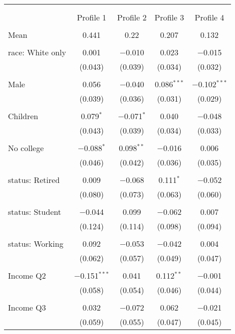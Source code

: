 
\begin{tabular}{@{\extracolsep{5pt}}lcccc} 
\\[-1.8ex]\hline 
\hline \\[-1.8ex] 
\\[-1.8ex] & Profile 1 & Profile 2 & Profile 3 & Profile 4 \\ 
\hline \\[-1.8ex] 
 Mean & 0.441 & 0.22 & 0.207 & 0.132  \\ \hline \\[-1.8ex] race: White only & 0.001 & $-$0.010 & 0.023 & $-$0.015 \\ 
  & (0.043) & (0.039) & (0.034) & (0.032) \\ 
  & & & & \\ 
 Male & 0.056 & $-$0.040 & 0.086$^{***}$ & $-$0.102$^{***}$ \\ 
  & (0.039) & (0.036) & (0.031) & (0.029) \\ 
  & & & & \\ 
 Children & 0.079$^{*}$ & $-$0.071$^{*}$ & 0.040 & $-$0.048 \\ 
  & (0.043) & (0.039) & (0.034) & (0.033) \\ 
  & & & & \\ 
 No college & $-$0.088$^{*}$ & 0.098$^{**}$ & $-$0.016 & 0.006 \\ 
  & (0.046) & (0.042) & (0.036) & (0.035) \\ 
  & & & & \\ 
 status: Retired & 0.009 & $-$0.068 & 0.111$^{*}$ & $-$0.052 \\ 
  & (0.080) & (0.073) & (0.063) & (0.060) \\ 
  & & & & \\ 
 status: Student & $-$0.044 & 0.099 & $-$0.062 & 0.007 \\ 
  & (0.124) & (0.114) & (0.098) & (0.094) \\ 
  & & & & \\ 
 status: Working & 0.092 & $-$0.053 & $-$0.042 & 0.004 \\ 
  & (0.062) & (0.057) & (0.049) & (0.047) \\ 
  & & & & \\ 
 Income Q2 & $-$0.151$^{***}$ & 0.041 & 0.112$^{**}$ & $-$0.001 \\ 
  & (0.058) & (0.054) & (0.046) & (0.044) \\ 
  & & & & \\ 
 Income Q3 & 0.032 & $-$0.072 & 0.062 & $-$0.021 \\ 
  & (0.059) & (0.055) & (0.047) & (0.045) \\ 

\end{tabular}
